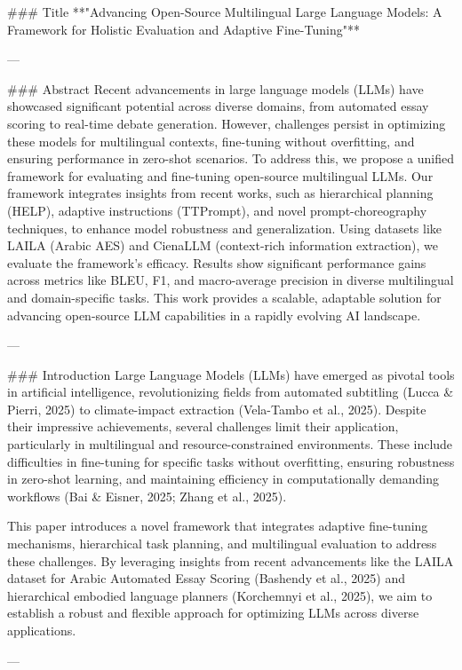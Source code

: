 ### Title  
**"Advancing Open-Source Multilingual Large Language Models: A Framework for Holistic Evaluation and Adaptive Fine-Tuning"**

---

### Abstract  
Recent advancements in large language models (LLMs) have showcased significant potential across diverse domains, from automated essay scoring to real-time debate generation. However, challenges persist in optimizing these models for multilingual contexts, fine-tuning without overfitting, and ensuring performance in zero-shot scenarios. To address this, we propose a unified framework for evaluating and fine-tuning open-source multilingual LLMs. Our framework integrates insights from recent works, such as hierarchical planning (HELP), adaptive instructions (TTPrompt), and novel prompt-choreography techniques, to enhance model robustness and generalization. Using datasets like LAILA (Arabic AES) and CienaLLM (context-rich information extraction), we evaluate the framework's efficacy. Results show significant performance gains across metrics like BLEU, F1, and macro-average precision in diverse multilingual and domain-specific tasks. This work provides a scalable, adaptable solution for advancing open-source LLM capabilities in a rapidly evolving AI landscape.

---

### Introduction  
Large Language Models (LLMs) have emerged as pivotal tools in artificial intelligence, revolutionizing fields from automated subtitling (Lucca & Pierri, 2025) to climate-impact extraction (Vela-Tambo et al., 2025). Despite their impressive achievements, several challenges limit their application, particularly in multilingual and resource-constrained environments. These include difficulties in fine-tuning for specific tasks without overfitting, ensuring robustness in zero-shot learning, and maintaining efficiency in computationally demanding workflows (Bai & Eisner, 2025; Zhang et al., 2025).

This paper introduces a novel framework that integrates adaptive fine-tuning mechanisms, hierarchical task planning, and multilingual evaluation to address these challenges. By leveraging insights from recent advancements like the LAILA dataset for Arabic Automated Essay Scoring (Bashendy et al., 2025) and hierarchical embodied language planners (Korchemnyi et al., 2025), we aim to establish a robust and flexible approach for optimizing LLMs across diverse applications.

---

